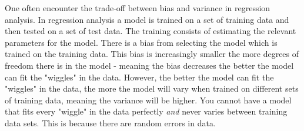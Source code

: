 \begin{example}
	One often encounter the trade-off between bias and variance in regression analysis. In regression analysis a model is trained on a set of training data and then tested on a set of test data. The training consists of estimating the relevant parameters for the model. There is a bias from selecting the model which is trained on the training data. This bias is increasingly smaller the more degrees of freedom there is in the model - meaning the bias decreases the better the model can fit the "wiggles" in the data. However, the better the model can fit the "wiggles" in the data, the more the model will vary when trained on different sets of training data, meaning the variance will be higher. You cannot have a model that fits every "wiggle" in the data perfectly \emph{and} never varies between training data sets. This is because there are random errors in data.
\end{example}
